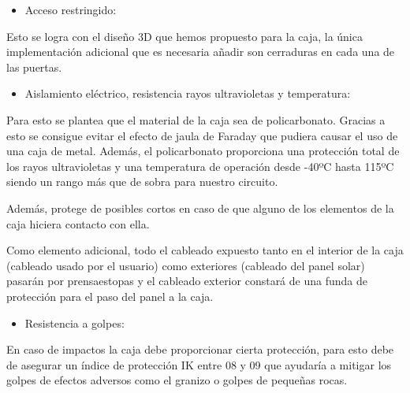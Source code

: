 \documentclass{article}
\begin{document}
\begin{itemize}
    \item Acceso restringido:
\end{itemize}

Esto se logra con el diseño 3D que hemos propuesto para la caja, la única implementación adicional que es necesaria añadir son cerraduras en cada una de las puertas.

\begin{itemize}
    \item Aislamiento eléctrico, resistencia rayos ultravioletas y temperatura:
\end{itemize}

Para esto se plantea que el material de la caja sea de policarbonato. Gracias a esto se consigue evitar el efecto de jaula de Faraday que pudiera causar el uso de una caja de metal. Además, el policarbonato proporciona una protección total de los rayos ultravioletas y una temperatura de operación desde -40ºC hasta 115ºC siendo un rango más que de sobra para nuestro circuito.

Además, protege de posibles cortos en caso de que alguno de los elementos de la caja hiciera contacto con ella.

Como elemento adicional, todo el cableado expuesto tanto en el interior de la caja (cableado usado por el usuario) como exteriores (cableado del panel solar) pasarán por prensaestopas y el cableado exterior constará de una funda de protección para el paso del panel a la caja.

\begin{itemize}
    \item Resistencia a golpes:
\end{itemize}

En caso de impactos la caja debe proporcionar cierta protección, para esto debe de asegurar un índice de protección IK entre 08 y 09 que ayudaría a mitigar los golpes de efectos adversos como el granizo o golpes de pequeñas rocas.
\end{document}
